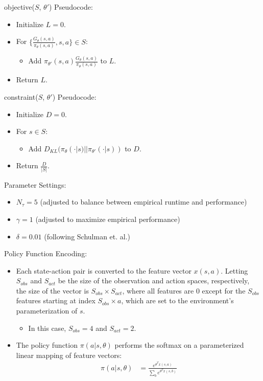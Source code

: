 \documentclass[a4paper]{article}
\begin{document}
objective($S$, $\theta'$) Pseudocode:
\begin{itemize}
    \item Initialize $L = 0$.
    \item For $\{\frac{G_{\theta}(s, a)}
            {\pi_{\theta}(s, a)}, s, a\} \in S$:
    \begin{itemize}
        \item Add $\pi_{\theta'}(s, a) 
            \frac{G_{\theta}(s, a)} {\pi_{\theta}(s, a)}$ to $L$.
    \end{itemize}
    \item Return $L$.
\end{itemize}
constraint($S$, $\theta'$) Pseudocode:
\begin{itemize}
    \item Initialize $D = 0$.
    \item For $s \in S$:
    \begin{itemize}
        \item Add $D_{KL}(\pi_{\theta}(\cdot | s) 
            || \pi_{\theta'}(\cdot | s))$ to $D$.
    \end{itemize}
    \item Return $\frac{D}{|S|}$.
\end{itemize}
Parameter Settings:
\begin{itemize}
    \item $N_{\tau} = 5$ (adjusted to balance between empirical runtime and
        performance) %
    \item $\gamma = 1$ (adjusted to maximize empirical performance)%
    \item $\delta = 0.01$ (following Schulman et. al.)%
\end{itemize}
Policy Function Encoding:
\begin{itemize}
    \item Each state-action pair is converted to the feature vector $x(s, a)$.
        Letting $S_{obs}$ and $S_{act}$ be the size of the observation and
        action spaces, respectively, the size of the vector is $S_{obs} \times
        S_{act}$, where all features are $0$ except for the $S_{obs}$ features
        starting at index $S_{obs} \times a$, which are set to the
        environment's parameterization of $s$.
    \begin{itemize}
        \item In this case, $S_{obs} = 4$ and $S_{act} = 2$.
    \end{itemize}
    \item The policy function $\pi(a | s, \theta)$ performs the softmax on a
        parameterized linear mapping of feature vectors:
        \begin{align*}
            \pi(a | s, \theta) &= \frac{e^{\theta^T x(s, a)}}
            {\sum_{b} e^{\theta^T x(s, b)}}\\
        \end{align*}
\end{itemize}
\end{document}
